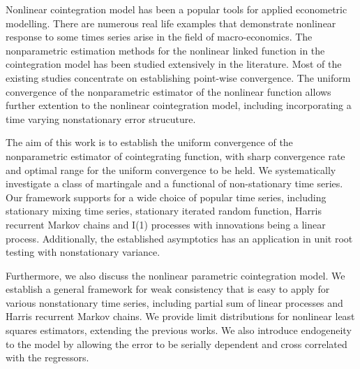 


\begin{abstracts}        %
Nonlinear cointegration model has been a popular tools for applied econometric modelling. There are numerous real life examples that demonstrate nonlinear response to some times series arise in the field of macro-economics. The nonparametric estimation methods for the nonlinear linked function in the cointegration model has been studied extensively in the literature. Most of the existing studies concentrate on establishing point-wise convergence. The uniform convergence of the nonparametric estimator of the nonlinear function allows further extention to the nonlinear cointegration model, including incorporating a time varying nonstationary error strucuture.

The aim of this work is to establish the uniform convergence of the nonparametric estimator of cointegrating function, with sharp convergence rate and  optimal range for the uniform convergence to be held. We systematically investigate a class of martingale and a functional of non-stationary time series. Our framework supports for a wide choice of popular time series, including stationary mixing time series, stationary iterated random function, Harris recurrent Markov chains and I(1) processes with innovations being a linear process. Additionally, the established asymptotics has an application in unit root testing with nonstationary variance.

Furthermore, we also discuss the nonlinear parametric cointegration model. We establish a general framework for weak consistency that is easy to apply for various nonstationary time series, including partial sum of linear processes and Harris recurrent Markov chains. We provide limit distributions for nonlinear least squares estimators, extending the previous works. We also introduce endogeneity to the model by allowing the error to be serially dependent and cross correlated with the regressors.


\end{abstracts}




